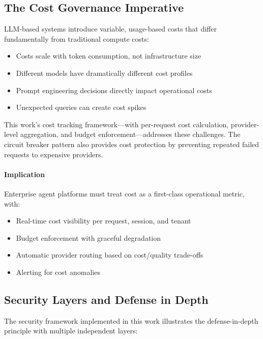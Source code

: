\subsection{The Cost Governance Imperative}

LLM-based systems introduce variable, usage-based costs that differ fundamentally from traditional compute costs:

\begin{itemize}
    \item Costs scale with token consumption, not infrastructure size
    \item Different models have dramatically different cost profiles
    \item Prompt engineering decisions directly impact operational costs
    \item Unexpected queries can create cost spikes
\end{itemize}

This work's cost tracking framework---with per-request cost calculation, provider-level aggregation, and budget enforcement---addresses these challenges. The circuit breaker pattern also provides cost protection by preventing repeated failed requests to expensive providers.

\paragraph{Implication}
Enterprise agent platforms must treat cost as a first-class operational metric, with:
\begin{itemize}
    \item Real-time cost visibility per request, session, and tenant
    \item Budget enforcement with graceful degradation
    \item Automatic provider routing based on cost/quality trade-offs
    \item Alerting for cost anomalies
\end{itemize}

\subsection{Security Layers and Defense in Depth}

The security framework implemented in this work illustrates the defense-in-depth principle with multiple independent layers:

